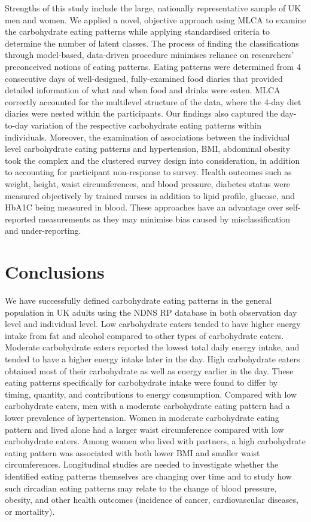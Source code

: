 Strengths of this study include the large, nationally representative sample of UK men and women. We applied a novel, objective approach using MLCA to examine the carbohydrate eating patterns while applying standardised criteria to determine the number of latent classes. The process of finding the classifications through model-based, data-driven procedure minimises reliance on researchers' preconceived notions of eating patterns. Eating patterns were determined from 4 consecutive days of well-designed, fully-examined food diaries that provided detailed information of what and when food and drinks were eaten. MLCA correctly accounted for the multilevel structure of the data, where the 4-day diet diaries were nested within the participants. Our findings also captured the day-to-day variation of the respective carbohydrate eating patterns within individuals. Moreover, the examination of associations between the individual level carbohydrate eating patterns and hypertension, BMI, abdominal obesity took the complex and the clustered survey design into consideration, in addition to accounting for participant non-response to survey. Health outcomes such as weight, height, waist circumferences, and blood pressure, diabetes status were measured objectively by trained nurses in addition to lipid profile, glucose, and HbA1C being measured in blood. These approaches have an advantage over self-reported measurements as they may minimise bias caused by misclassification and under-reporting.

\section{Conclusions}

We have successfully defined carbohydrate eating patterns in the general population in UK adults using the NDNS RP database in both observation day level and individual level. Low carbohydrate eaters tended to have higher energy intake from fat and alcohol compared to other types of carbohydrate eaters. Moderate carbohydrate eaters reported the lowest total daily energy intake, and tended to have a higher energy intake later in the day. High carbohydrate eaters obtained most of their carbohydrate as well as energy earlier in the day. These eating patterns specifically for carbohydrate intake were found to differ by timing, quantity, and contributions to energy consumption. Compared with low carbohydrate eaters, men with a moderate carbohydrate eating pattern had a lower prevalence of hypertension. Women in moderate carbohydrate eating pattern and lived alone had a larger waist circumference compared with low carbohydrate eaters. Among women who lived with partners, a high carbohydrate eating pattern was associated with both lower BMI and smaller waist circumferences. Longitudinal studies are needed to investigate whether the identified eating patterns themselves are changing over time and to study how such circadian eating patterns may relate to the change of blood pressure, obesity, and other health outcomes (incidence of cancer, cardiovascular diseases, or mortality).